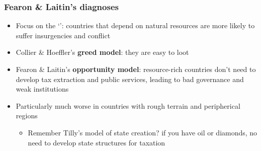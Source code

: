 \documentclass[aspectratio=43]{beamer}
\begin{document}
\begin{frame}
\frametitle{Fearon \& Laitin's diagnoses}
\centering

\begin{itemize}
  \item Focus on the `': countries that depend on natural resources are more likely to suffer insurgencies and conflict
  \item<2-> Collier \& Hoeffler's \textbf{greed model}: they are easy to loot
  \item<2-> Fearon \& Laitin's \textbf{opportunity model}: resource-rich countries don't need to develop tax extraction and public services, leading to bad governance and weak institutions
  \item<3-> Particularly much worse in countries with rough terrain and peripherical regions
  \begin{itemize}
    \item Remember Tilly's model of state creation? if you have oil or diamonds, no need to develop state structures for taxation
  \end{itemize}
\end{itemize}

\end{frame}
\end{document}
